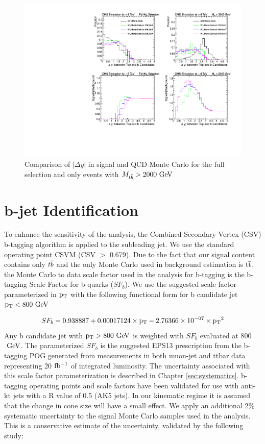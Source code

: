 \begin{figure}[htb]
\centering
\includegraphics[width=1.0\textwidth]{AN-13-004/figs/drapCompqcdandsignal}
\caption{Comparison of $|\Delta y|$ in signal and QCD Monte Carlo for the full selection and only events with $M_{{t\overline{b}}} > 2000~\mathrm{GeV}$}
\label{figs:CutComp}
\end{figure}



\section{b-jet Identification}
\label{sec:btagging}
To enhance the sensitivity of the analysis, the Combined Secondary Vertex (CSV) b-tagging algorithm is applied to the subleading jet. We use the standard operating point CSVM (CSV $>$ 0.679).
Due to the fact that our signal content 
contains only ${t\overline{b}}$ and the only Monte Carlo used in background estimation is $\mathrm{t\overline{t}}$, the Monte Carlo to data scale factor used in the analysis for b-tagging 
is the b-tagging Scale Factor for b quarks ($SF_b$).  We use the suggested scale factor parameterized in $\mathrm{p_{T}}$ with the following functional form for 
b candidate jet $\mathrm{p_{T}} < 800~\mathrm{GeV}$

\begin{eqnarray}
SF_b = 0.938887 + 0.00017124\times \mathrm{p_{T}} - 2.76366 \times 10^{-07} \times \mathrm{p_{T}}^2 
\end{eqnarray}
Any b candidate jet with $\mathrm{p_{T}} > 800~\mathrm{GeV}$ is weighted with $SF_b$ evaluated at 800$~\mathrm{GeV}$.  The parameterized $SF_b$ is the 
suggested EPS13 prescription \cite{CMS-PAS-BTV-13-001} from the b-tagging POG generated from measurements in both muon-jet and ttbar data representing 20$~\mathrm{fb^{-1}}$ of integrated 
luminosity. The uncertainty associated with this scale factor parameterization is described in Chapter \ref{sec:systematics}.  b-tagging operating points 
and scale factors have been validated for use with anti-kt jets with a R value of 0.5 (AK5 jets).  In our kinematic regime it is assumed that the change in cone size 
will have a small effect. We apply an additional $2\%$ systematic uncertainty to the signal Monte Carlo samples used in the analysis. This is a conservative estimate of the uncertainty, validated by the following study: 

